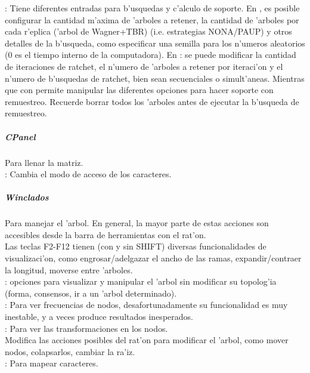 : Tiene diferentes entradas para b'usquedas y c'alculo de soporte. En , es posible configurar la cantidad m'axima de 'arboles a retener, la cantidad de 'arboles por cada r'eplica ('arbol de Wagner+TBR) (i.e. estrategias NONA/PAUP) y otros detalles de la b'usqueda, como especificar una semilla para los n'umeros aleatorios (0 es el tiempo interno de la computadora). En : se puede modificar la cantidad de iteraciones de ratchet, el n'umero de 'arboles a retener por iteraci'on y el n'umero de b'usquedas de ratchet, bien sean secuenciales o simult'aneas. Mientras que con  permite manipular las diferentes opciones para hacer soporte con remuestreo. Recuerde borrar todos los 'arboles antes de ejecutar la b'usqueda de remuestreo.
\subparagraph*{CPanel}
Para llenar la matriz.\\
: Cambia el modo de acceso de los caracteres.
\subparagraph*{Winclados}
Para manejar el 'arbol. En general, la mayor parte de estas acciones son accesibles desde la barra de herramientas con el rat'on.\\
Las teclas F2-F12 tienen (con y sin SHIFT) diversas funcionalidades de visualizaci'on, como engrosar/adelgazar el ancho de las ramas, expandir/contraer la longitud, moverse entre 'arboles.\\
: opciones para visualizar y manipular el 'arbol sin modificar su topolog'ia (forma, consensos, ir a un 'arbol determinado).\\
: Para ver frecuencias de nodos, desafortunadamente su funcionalidad es muy inestable, y a veces produce resultados inesperados.\\
: Para ver las transformaciones en los nodos.\\
 Modifica las acciones posibles del rat'on para modificar el 'arbol, como mover nodos, colapsarlos, cambiar la ra'iz.\\
: Para mapear caracteres.

